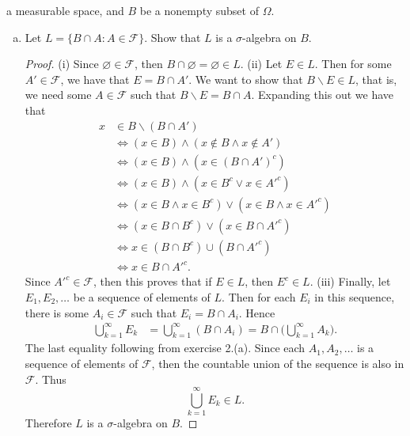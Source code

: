 \documentclass[12pt]{article}
\begin{document}
\begin{enumerate}
a measurable space, and $B$ be a nonempty subset of $\Omega$.
\begin{enumerate}[(a)] \item Let $L=\{B\cap A:A\in\mathcal{F}\}$. Show that $L$
        is a $\sigma$-algebra on $B$.  \begin{proof} (i) Since
            $\varnothing\in\mathcal{F}$, then $B\cap\varnothing=\varnothing\in
            L$. (ii) Let $E\in L$. Then for some $A'\in\mathcal{F}$, we have
            that $E=B\cap A'$.  We want to show that $B\backslash E\in L$, that
            is, we need some $A\in\mathcal{F}$ such that $B\backslash E=B\cap
            A$. Expanding this out we have that \begin{align*} x&\in
                B\backslash(B\cap A') \\ &\Leftrightarrow (x\in B)\land(x\notin
                B\land x\notin A') \\ &\Leftrightarrow (x\in B)\land(x\in(B\cap
                A')^c) \\ &\Leftrightarrow (x\in B)\land(x\in B^c\vee x\in
                A'^c) \\ &\Leftrightarrow(x\in B\land x\in B^c)\vee(x\in B\land
                x\in A'^c) \\ &\Leftrightarrow (x\in B\cap B^c)\vee(x\in B\cap
                A'^c) \\ &\Leftrightarrow x\in(B\cap B^c)\cup(B\cap A'^c) \\
            &\Leftrightarrow x\in B\cap A'^c.  \end{align*} Since
            $A'^c\in\mathcal{F}$, then this proves that if $E\in L$, then
            $E^c\in L$. (iii) Finally, let $E_1, E_2, \dots$ be a sequence of
            elements of $L$. Then for each $E_i$ in this sequence, there is
            some $A_i\in\mathcal{F}$ such that $E_{i}=B\cap A_i$. Hence
            \begin{align*} \bigcup_{k=1}^{\infty}E_k &=
                \bigcup_{k=1}^{\infty}(B\cap
                A_i)=B\cap\big(\bigcup_{k=1}^{\infty}A_k\big).  \end{align*}
                The last equality following from exercise 2.(a). Since each
                $A_1, A_2, \dots$ is a sequence of elements of $\mathcal{F}$,
                then the countable union of the sequence is also in
            $\mathcal{F}$. Thus \begin{equation*} \bigcup_{k=1}^{\infty}E_k\in
        L.  \end{equation*} Therefore $L$ is a $\sigma$-algebra on $B$.

\end{proof}
\end{enumerate}
\end{enumerate}
\end{document}
